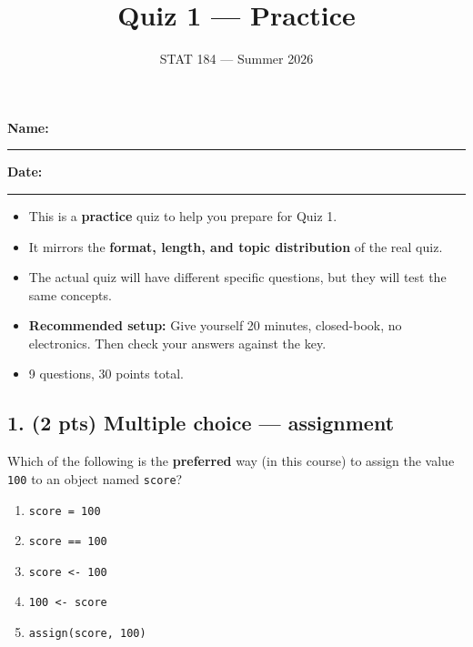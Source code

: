 \documentclass[
  11pt,
  letterpaper,
  DIV=11,
  numbers=noendperiod]{scrartcl}
\title{Quiz 1 --- Practice}
\subtitle{STAT 184 --- Summer 2026}
\author{}
\date{}
\providecommand{\tightlist}{%
  \setlength{\itemsep}{0pt}\setlength{\parskip}{0pt}}
\begin{document}
\maketitle

\noindent \textbf{Name:} \rule{2in}{0.4pt} \hfill \textbf{Date:} \rule{2in}{0.4pt}

\vspace{0.5em}

\begin{tcolorbox}[enhanced jigsaw, arc=.35mm, bottomrule=.15mm, bottomtitle=1mm, breakable, colback=white, colbacktitle=quarto-callout-note-color!10!white, colframe=quarto-callout-note-color-frame, coltitle=black, left=2mm, leftrule=.75mm, opacityback=0, opacitybacktitle=0.6, rightrule=.15mm, title=\textcolor{quarto-callout-note-color}{\faInfo}\hspace{0.5em}{About this practice quiz}, titlerule=0mm, toprule=.15mm, toptitle=1mm]

\begin{itemize}
\tightlist
\item This is a \textbf{practice} quiz to help you prepare for Quiz 1.
\item It mirrors the \textbf{format, length, and topic distribution} of the real quiz.
\item The actual quiz will have different specific questions, but they will test the same concepts.
\item \textbf{Recommended setup:} Give yourself 20 minutes, closed-book, no electronics. Then check your answers against the key.
\item 9 questions, 30 points total.
\end{itemize}

\end{tcolorbox}

\vspace{0.5em}

\subsection{1. (2 pts) Multiple choice --- assignment}

Which of the following is the \textbf{preferred} way (in this course) to assign the value \texttt{100} to an object named \texttt{score}?

\vspace{0.25em}

\begin{enumerate}
\def\labelenumi{(\Alph{enumi})}
\tightlist
\item \texttt{score\ =\ 100}
\item \texttt{score\ ==\ 100}
\item \texttt{score\ \textless{}-\ 100}
\item \texttt{100\ \textless{}-\ score}
\item \texttt{assign(score,\ 100)}
\end{enumerate}
\end{document}
